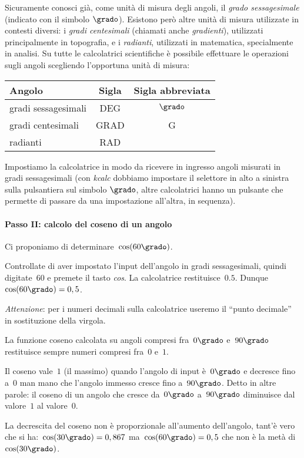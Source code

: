 Sicuramente conosci già, come unità di misura degli angoli, il \emph{grado sessagesimale} (indicato con il simbolo $\grado$). Esistono però altre unità di misura utilizzate in contesti diversi:
i \emph{gradi centesimali} (chiamati anche \emph{gradienti}), utilizzati principalmente in topografia, e i \emph{radianti}, utilizzati in matematica, specialmente in analisi.
Su tutte le calcolatrici scientifiche è possibile effettuare le operazioni sugli angoli scegliendo l'opportuna unità di misura:

\begin{center}
\begin{tabular}{lcc}
\toprule
Angolo & Sigla & Sigla abbreviata \\
\midrule
gradi sessagesimali & DEG & $\grado$ \\
gradi centesimali & GRAD & G \\
radianti & RAD & \\
\bottomrule
\end{tabular}
\end{center}

Impostiamo la calcolatrice in modo da ricevere in ingresso angoli misurati in gradi sessagesimali (con \emph{kcalc} dobbiamo impostare il selettore in alto a sinistra sulla pulsantiera sul simbolo $\grado$, altre calcolatrici hanno un pulsante che permette di passare da una impostazione all'altra, in sequenza).

\paragraph{Passo II: calcolo del coseno di un angolo}

Ci proponiamo di determinare~$\cos(60\grado)$.

Controllate di aver impostato l'input dell'angolo in gradi sessagesimali, quindi
digitate~$60$ e premete il tasto \emph{cos}. La calcolatrice restituisce~$0.5$.
Dunque~$\cos(60\grado)=0,5$.

\emph{Attenzione}: per i numeri decimali sulla calcolatrice useremo il ``punto decimale'' in sostituzione della virgola.

\osservazione
\begin{enumeratea}
\item La funzione coseno calcolata su angoli compresi fra~$0\grado$ e~$90\grado$ restituisce sempre numeri compresi fra~$0$ e~$1$.
\item Il coseno vale~$1$ (il massimo) quando l'angolo di input è~$0\grado$ e decresce fino a~$0$ man mano che l'angolo immesso cresce fino
   a~$90\grado$. Detto in altre parole: il coseno di un angolo che cresce da~$0\grado$ a~$90\grado$ diminuisce dal valore~$1$ al valore~$0$.
\item La decrescita del coseno non è proporzionale all'aumento dell'angolo, tant'è vero che si ha:~$\cos(30\grado)=0,867$
   ma~$\cos(60\grado)=0,5$ che non è la metà di~$\cos(30\grado)$.
\end{enumeratea}


